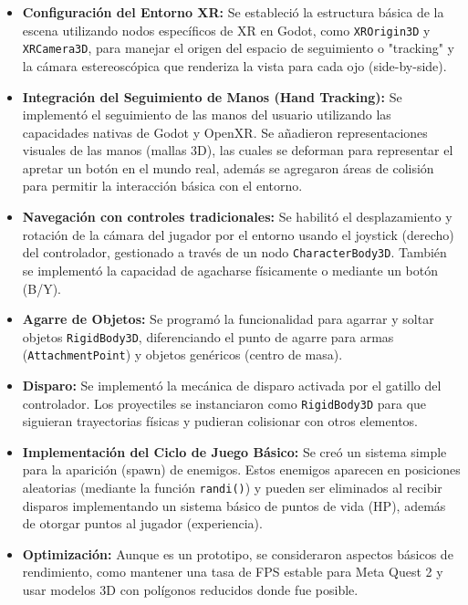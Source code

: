 \documentclass[journal,article,accept,pdftex,moreauthors]{Definitions/mdpi}
\begin{document}
\begin{itemize}
    \item \textbf{Configuración del Entorno XR:} Se estableció la estructura básica de la escena utilizando nodos específicos de XR en Godot, como \texttt{XROrigin3D} y \texttt{XRCamera3D}, para manejar el origen del espacio de seguimiento o "tracking" y la cámara estereoscópica que renderiza la vista para cada ojo (side-by-side).
    
    \item \textbf{Integración del Seguimiento de Manos (Hand Tracking):} Se implementó el seguimiento de las manos del usuario utilizando las capacidades nativas de Godot y OpenXR. Se añadieron representaciones visuales de las manos (mallas 3D), las cuales se deforman para representar el apretar un botón en el mundo real, además se agregaron áreas de colisión para permitir la interacción básica con el entorno.
    
    \item \textbf{Navegación con controles tradicionales:} Se habilitó el desplazamiento y rotación de la cámara del jugador por el entorno usando el joystick (derecho) del controlador, gestionado a través de un nodo \texttt{CharacterBody3D}. También se implementó la capacidad de agacharse físicamente o mediante un botón (B/Y).
    
    \item \textbf{Agarre de Objetos:} Se programó la funcionalidad para agarrar y soltar objetos \texttt{RigidBody3D}, diferenciando el punto de agarre para armas (\texttt{AttachmentPoint}) y objetos genéricos (centro de masa).
    
    \item \textbf{Disparo:} Se implementó la mecánica de disparo activada por el gatillo del controlador. Los proyectiles se instanciaron como \texttt{RigidBody3D} para que siguieran trayectorias físicas y pudieran colisionar con otros elementos.
    
    \item \textbf{Implementación del Ciclo de Juego Básico:} Se creó un sistema simple para la aparición (spawn) de enemigos. Estos enemigos aparecen en posiciones aleatorias (mediante la función \texttt{randi()}) y pueden ser eliminados al recibir disparos implementando un sistema básico de puntos de vida (HP), además de otorgar puntos al jugador (experiencia).
    
    \item \textbf{Optimización:} Aunque es un prototipo, se consideraron aspectos básicos de rendimiento, como mantener una tasa de FPS estable para Meta Quest 2 y usar modelos 3D con polígonos reducidos donde fue posible.
\end{itemize}
\end{document}
